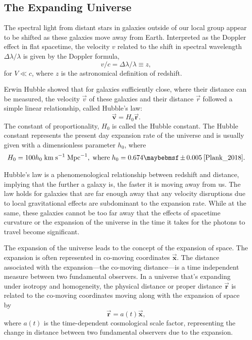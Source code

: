 \subsection{The Expanding Universe}

The spectral light from distant stars in galaxies outside of our local group appear to be shifted as these galaxies move away from Earth. Interpreted as the Doppler effect in flat spacetime, the velocity $v$ related to the shift in  spectral wavelength $\Delta \lambda/\lambda$ is given by the Doppler formula,
%
\begin{equation}
  v/c = \Delta \lambda/\lambda \equiv z,
\end{equation}
%
for $V \ll c$, where $z$ is the astronomical definition of redshift. 

Erwin Hubble showed that for galaxies sufficiently close, where their distance can be measured, the velocity $\vec{v}$ of these galaxies and their distance $\vec{r}$ followed a simple linear relationship, called Hubble's law:
%
\begin{equation}
  \boldsymbol{\vec{v}} = H_0\boldsymbol{\vec{r}}.
\end{equation}
%
The constant of proportionality, $H_0$ is called the Hubble constant. The Hubble constant represents the present day expansion rate of the universe and is usually given with a dimensionless parameter $h_0$, where
%
\begin{equation}\label{eq:hubble_constant}
  H_0 = 100h_0 \; \MathText{km} \; \MathText{s}^{-1} \; \MathText{Mpc}^{-1}, \; \MathText{where} \; h_0 = 0.674 \pm 0.005 \: \cite{Plank_2018}.
\end{equation}
%

Hubble's law is a phenomenological relationship between redshift and distance, implying that the further a galaxy is, the faster it is moving away from us. The law holds for galaxies that are far enough away that any velocity disruptions due to local gravitational effects are subdominant to the expansion rate. While at the same, these galaxies cannot be too far away that the effects of spacetime curvature or the expansion of the universe in the time it takes for the photons to travel become significant. 

The expansion of the universe leads to the concept of the expansion of space. The expansion is often represented in co-moving coordinates $\boldsymbol{\vec{x}}$. The distance associated with the expansion---the co-moving distance---is a time independent measure between two fundamental observers. In a universe that's expanding under isotropy and homogeneity, the physical distance or proper distance $\boldsymbol{\vec{r}}$ is related to the co-moving coordinates moving along with the expansion of space by
%
\begin{equation}
  \boldsymbol{\vec{r}} = a(t)\boldsymbol{\vec{x}},
\end{equation}
%
where $a(t)$ is the time-dependent cosmological scale factor, representing the change in distance between two fundamental observers due to the expansion.

